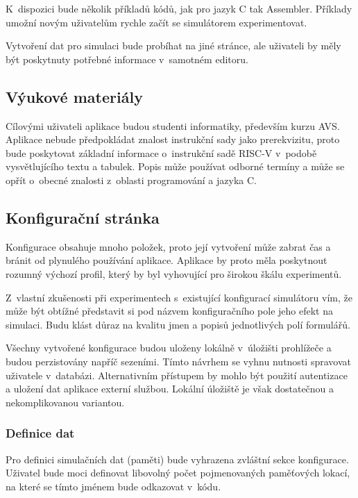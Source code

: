K~dispozici bude několik příkladů kódů, jak pro jazyk C tak Assembler.
Příklady umožní novým uživatelům rychle začít se simulátorem experimentovat.

Vytvoření dat pro simulaci bude probíhat na jiné stránce, ale uživateli by měly být poskytnuty potřebné informace v~samotném editoru.  

\subsection{Výukové materiály}

Cílovými uživateli aplikace budou studenti informatiky, především kurzu AVS.
Aplikace nebude předpokládat znalost instrukční sady jako prerekvizitu, proto bude poskytovat základní informace o~instrukční sadě RISC-V v~podobě vysvětlujícího textu a tabulek.
Popis může používat odborné termíny a může se opřít o~obecné znalosti z~oblasti programování a jazyka C.

\subsection{Konfigurační stránka}

Konfigurace obsahuje mnoho položek, proto její vytvoření může zabrat čas a bránit od plynulého používání aplikace.
Aplikace by proto měla poskytnout rozumný výchozí profil, který by byl vyhovující pro širokou škálu experimentů.

Z~vlastní zkušenosti při experimentech s~existující konfigurací simulátoru vím, že může být obtížné představit si pod názvem konfiguračního pole jeho efekt na simulaci.
Budu klást důraz na kvalitu jmen a popisů jednotlivých polí formulářů.

Všechny vytvořené konfigurace budou uloženy lokálně v~úložišti prohlížeče a budou perzistovány napříč sezeními.
Tímto návrhem se vyhnu nutnosti spravovat uživatele v~databázi.
Alternativním přístupem by mohlo být použití autentizace a uložení dat aplikace externí službou.
Lokální úložiště je však dostatečnou a nekomplikovanou variantou.

\subsubsection{Definice dat}

Pro definici simulačních dat (paměti) bude vyhrazena zvláštní sekce konfigurace. 
Uživatel bude moci definovat libovolný počet pojmenovaných paměťových lokací, na které se tímto jménem bude odkazovat v~kódu.

